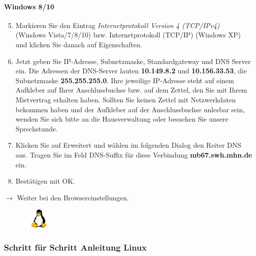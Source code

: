 \documentclass[a4paper,12pt]{scrartcl}
\begin{document}
\paragraph*{Windows 8/10}
\begin{enumerate}
    \setcounter{enumi}{4}
    \item Markieren Sie den Eintrag \textit{Internetprotokoll Version 4 (TCP/IPv4)} (Windows Vista/7/8/10) bzw. Internetprotokoll  (TCP/IP) (Windows XP) und klicken Sie danach auf Eigenschaften.
    \item Jetzt geben Sie IP-Adresse, Subnetzmaske, Standardgateway und DNS Server ein. Die Adressen der DNS-Server lauten \textbf{10.149.8.2} und \textbf{10.156.33.53}, die Subnetzmaske \textbf{255.255.255.0}. Ihre jeweilige IP-Adresse steht auf einem Aufkleber auf Ihrer Anschlussbuchse bzw. auf dem Zettel, den Sie mit Ihrem Mietvertrag erhalten haben. Sollten Sie keinen Zettel mit Netzwerkdaten bekommen haben und der Aufkleber auf der Anschlussbuchse unlesbar sein, wenden Sie sich bitte an die Hausverwaltung oder besuchen Sie unsere Sprechstunde.
    \item Klicken Sie auf Erweitert und wählen im folgenden Dialog den Reiter DNS aus. Tragen Sie im Feld DNS-Suffix für diese Verbindung \textbf{mb67.swh.mhn.de} ein.
    \item Bestätigen mit OK.
\end{enumerate}
$\rightarrow$ Weiter bei den Browsereinstellungen.



\pagebreak

\begin{figure}[t!]
	\raggedleft
	\vspace{-20pt}
	\includegraphics[height=1cm,keepaspectratio]{Bilder/linux_logo_neu}
	\vspace{-30pt}
\end{figure}



\subsubsection*{Schritt für Schritt Anleitung Linux}
\end{document}
